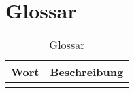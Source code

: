 \chapter{Glossar}
  \begin{longtable}{|p{4cm}|p{10cm}|}
      \caption{Glossar}\\
\hline
  Wort & Beschreibung\\
  \hline
  & \\
  \hline
  
  \end{longtable}


